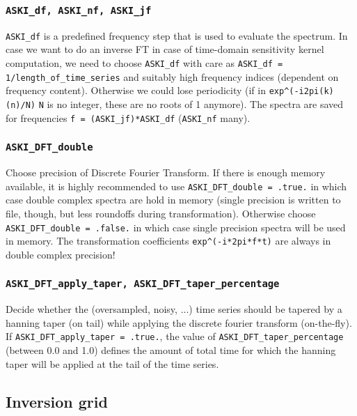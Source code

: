 \documentclass[12pt,a4paper]{article}
\newcommand{\lcode}[1]{\nolinkurl{#1}}
\begin{document}
\subsubsection*{\lcode{ASKI_df, ASKI_nf, ASKI_jf}}
\lcode{ASKI_df} is a predefined frequency step that is used to evaluate the spectrum. In case we want to do 
an inverse FT in case of time-domain sensitivity kernel computation, we need to choose \lcode{ASKI_df} with care 
as \lcode{ASKI_df = 1/length_of_time_series} and suitably high frequency indices (dependent on frequency content).
Otherwise we could lose periodicity (if in \lcode{exp^(-i2pi(k)(n)/N)} \lcode{N} is no integer, these are no 
roots of 1 anymore). The spectra are saved for frequencies \lcode{f = (ASKI_jf)*ASKI_df} (\lcode{ASKI_nf} many).
\subsubsection*{\lcode{ASKI_DFT_double}}
Choose precision of Discrete Fourier Transform. If there is enough memory available, it is highly recommended
to use \lcode{ASKI_DFT_double = .true.} in which case double complex spectra are hold in memory (single precision is 
written to file, though, but less roundoffs during transformation). Otherwise choose \lcode{ASKI_DFT_double = .false.}
in which case single precision spectra will be used in memory. The transformation coefficients \lcode{exp^(-i*2pi*f*t)} 
are always in double complex precision!
\subsubsection*{\lcode{ASKI_DFT_apply_taper, ASKI_DFT_taper_percentage}}
Decide whether the (oversampled, noisy, ...) time series should be tapered by a hanning taper (on tail)
while applying the discrete fourier transform (on-the-fly). If \lcode{ASKI_DFT_apply_taper = .true.},
the value of \lcode{ASKI_DFT_taper_percentage} (between 0.0 and 1.0) defines the amount of
total time for which the hanning taper will be applied at the tail of the time series.
\subsection{Inversion grid}
\end{document}
